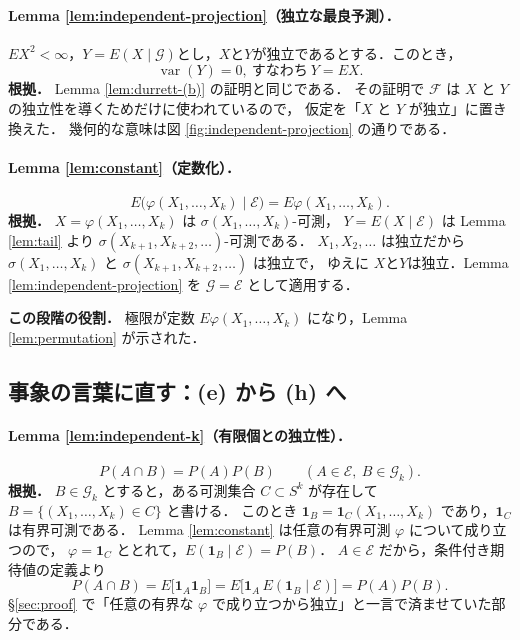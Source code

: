 \documentclass[a4paper,11pt,uplatex,dvipdfmx]{jsarticle}
\theoremstyle{plain}
\theoremstyle{definition}
\DeclareMathOperator{\var}{var}
\begin{document}
\paragraph{Lemma \ref{lem:independent-projection}（独立な最良予測）．}
$EX^2<\infty$，$Y=E(X\mid\mathcal{G})$とし，$X$と$Y$が独立であるとする．このとき，
\[
  \var(Y)=0,\ \text{すなわち}\ Y=EX.
\]
\textbf{根拠．}
Lemma \ref{lem:durrett-(b)} の証明と同じである．
その証明で $\mathcal{F}$ は $X$ と $Y$ の独立性を導くためだけに使われているので，
仮定を「$X$ と $Y$ が独立」に置き換えた．
幾何的な意味は図 \ref{fig:independent-projection} の通りである．

\paragraph{Lemma \ref{lem:constant}（定数化）．}
\[
  E\bigl(\varphi(X_1,\dots,X_k)\mid\mathcal{E}\bigr)=E\varphi(X_1,\dots,X_k).
\]
\textbf{根拠．}
$X=\varphi(X_1,\dots,X_k)$ は $\sigma(X_1,\dots,X_k)$-可測，
$Y=E(X\mid\mathcal{E})$ は Lemma \ref{lem:tail} より $\sigma(X_{k+1},X_{k+2},\dots)$-可測である．
$X_1,X_2,\dots$ は独立だから $\sigma(X_1,\dots,X_k)$ と $\sigma(X_{k+1},X_{k+2},\dots)$ は独立で，
ゆえに $X$と$Y$は独立．Lemma \ref{lem:independent-projection} を $\mathcal{G}=\mathcal{E}$ として適用する．

\medskip\noindent\textbf{この段階の役割．}
極限が定数 $E\varphi(X_1,\dots,X_k)$ になり，Lemma \ref{lem:permutation} が示された．

\subsection{事象の言葉に直す：(e) から (h) へ}\label{subsec:directly-events}

\paragraph{Lemma \ref{lem:independent-k}（有限個との独立性）．}
\[
  P(A\cap B)=P(A)P(B)\qquad(A\in\mathcal{E},\ B\in\mathcal{G}_k).
\]
\textbf{根拠．}
$B\in\mathcal{G}_k$ とすると，ある可測集合 $C\subset S^k$ が存在して
$B=\{(X_1,\dots,X_k)\in C\}$ と書ける．
このとき $\mathbf{1}_B=\mathbf{1}_C(X_1,\dots,X_k)$ であり，$\mathbf{1}_C$ は有界可測である．
Lemma \ref{lem:constant} は任意の有界可測 $\varphi$ について成り立つので，
$\varphi=\mathbf{1}_C$ ととれて，$E(\mathbf{1}_B\mid\mathcal{E})=P(B)$．
$A\in\mathcal{E}$ だから，条件付き期待値の定義より
\[
  P(A\cap B)=E\bigl[\mathbf{1}_A\mathbf{1}_B\bigr]=E\bigl[\mathbf{1}_A\,E(\mathbf{1}_B\mid\mathcal{E})\bigr]=P(A)P(B).
\]
\S\ref{sec:proof} で「任意の有界な $\varphi$ で成り立つから独立」と一言で済ませていた部分である．
\end{document}
